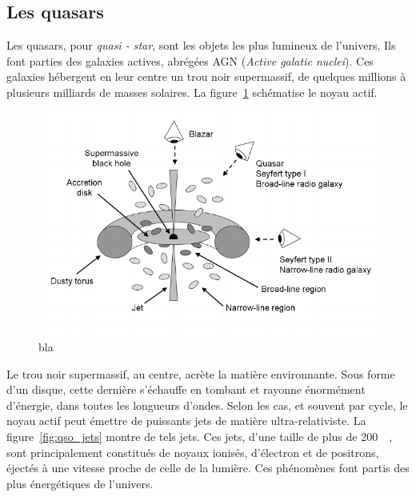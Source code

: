 \documentclass[11pt, twoside, a4paper, openright]{report}
\begin{document}
\subsection{Les quasars}
Les quasars, pour \emph{quasi - star}, sont les objets les plus lumineux de l'univers. Ils font parties des galaxies actives, abrégées AGN (\emph{Active galatic nuclei}). Ces galaxies hébergent en leur centre un trou noir supermassif, de quelques millions à plusieurs milliards de masses solaires. La figure~\ref{fig:schema_qso} schématise le noyau actif. 
\begin{figure}
  \centering
  \includegraphics[scale=0.5]{schema_qso.png}
  \caption{bla}
  \label{fig:schema_qso}
\end{figure}
Le trou noir supermassif, au centre, acrète la matière environnante. Sous forme d'un disque, cette dernière s'échauffe en tombant et rayonne énormément d'énergie, dans toutes les longueurs d'ondes. Selon les cas, et souvent par cycle, le noyau actif peut émettre de puissants jets de matière ultra-relativiste. La figure~\ref{fig:qso_jets} montre de tels jets. Ces jets, d'une taille de plus de \SI{200}{\perh\kpc}, sont principalement constitués de noyaux ionisés, d'électron et de positrons, éjectés à une vitesse proche de celle de la lumière. Ces phénomènes font partis des plus énergétiques de l'univers.
\end{document}
